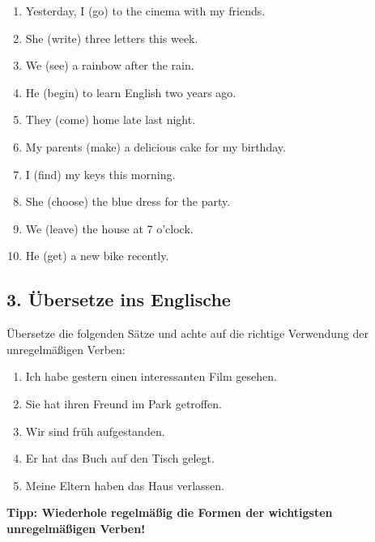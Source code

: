 \begin{enumerate}
    \item Yesterday, I (go) \underline{\hspace{2cm}} to the cinema with my friends.
    \item She (write) \underline{\hspace{2cm}} three letters this week.
    \item We (see) \underline{\hspace{2cm}} a rainbow after the rain.
    \item He (begin) \underline{\hspace{2cm}} to learn English two years ago.
    \item They (come) \underline{\hspace{2cm}} home late last night.
    \item My parents (make) \underline{\hspace{2cm}} a delicious cake for my birthday.
    \item I (find) \underline{\hspace{2cm}} my keys this morning.
    \item She (choose) \underline{\hspace{2cm}} the blue dress for the party.
    \item We (leave) \underline{\hspace{2cm}} the house at 7 o'clock.
    \item He (get) \underline{\hspace{2cm}} a new bike recently.
\end{enumerate}

\subsection*{3. Übersetze ins Englische}
Übersetze die folgenden Sätze und achte auf die richtige Verwendung der unregelmäßigen Verben:

\begin{enumerate}
    \item Ich habe gestern einen interessanten Film gesehen.
    \item Sie hat ihren Freund im Park getroffen.
    \item Wir sind früh aufgestanden.
    \item Er hat das Buch auf den Tisch gelegt.
    \item Meine Eltern haben das Haus verlassen.
\end{enumerate}

\vspace{1cm}
\textbf{Tipp: Wiederhole regelmäßig die Formen der wichtigsten unregelmäßigen Verben!}
